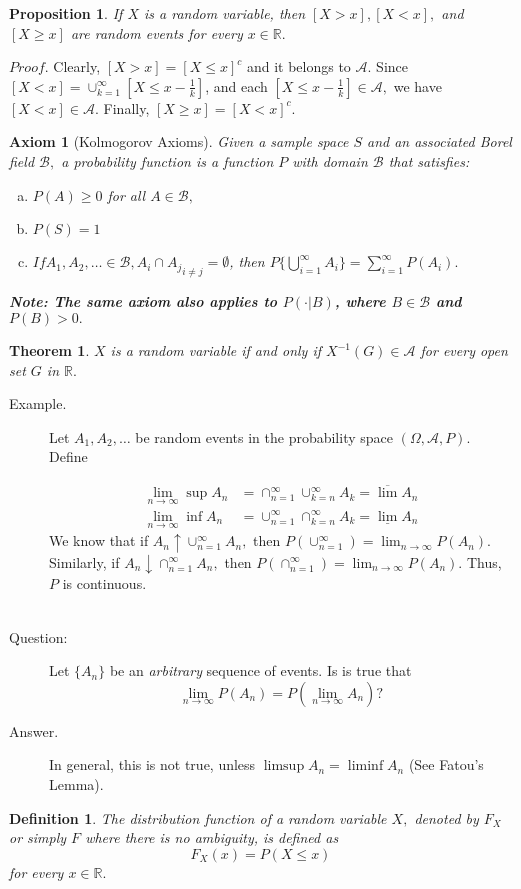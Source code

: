 \documentclass[12pt]{report} \addtolength{\textheight}{2in}
\newtheorem{defn}{Definition}
\newtheorem{axiom}{Axiom}
\newtheorem{prop}{Proposition}
\newtheorem{thm}{Theorem}
\newcommand{\Borel}{\mathscr{B}}
\newcommand{\Realnum}{\mathbb{R}}
\newcommand{\bigA}{\mathcal{A}}
\newcommand{\infU}{ \bigcup_{i=1}^{\infty}}
\newcommand{\probsp}{(\Omega, \bigA, P)}
\newcommand{\infsum}{\sum_{i=1}^{\infty}}
\begin{document}
\begin{prop}
If $X$ is a random variable, then $[X > x],[X < x],$ and $[X \geq x]$ are random events for every $x \in \Realnum.$
\end{prop}
$Proof.$ Clearly, $[X>x]=[X \leq x]^c$ and it belongs to $\bigA.$ Since $[X<x]=\cup_{k=1}^{\infty}[X \leq x -\frac{1}{k}]$, and each $[X \leq x -\frac{1}{k}] \in \bigA,$ we have $[X < x]\in \bigA.$ Finally, $[X \geq x] =[X < x]^c.$
\begin{axiom}[Kolmogorov Axioms]
Given a sample space $S$ and an associated Borel field $\Borel,$ a probability function is a function $P$ with domain $\Borel$ that satisfies:
\begin{enumerate}[a)]
\item $P(A) \geq 0$ for all $A \in \Borel,$
\item $P(S) =1$
\item $ If A_1,A_2,\dots \in \Borel, {A_i \cap A_j}_{i\not = j} = \emptyset$, then $P\{\infU A_i\}=\infsum P(A_i).$
\end{enumerate}
\textbf{Note: The same axiom also applies to $P(\cdot|B)$, where $B\in \Borel$ and $P(B)>0.$}
\end{axiom}
\begin{thm}
$X$ is a random variable if and only if $X^{-1}(G)\in \mathcal{A}$ for every open set $G$ in $\Realnum.$
\end{thm}
\vspace{.1in}
\begin{description}
\item[Example.] Let $A_1,A_2,\dots$ be random events in the probability space $\probsp.$ Define 

\begin{align*}
\lim_{n\to\infty}\sup A_n&=\cap_{n=1}^{\infty}\cup_{k=n}^{\infty} A_k=\overline{\lim} A_n\\
\lim_{n\to\infty}\inf A_n&=\cup_{n=1}^{\infty}\cap_{k=n}^{\infty} A_k=\underline{\lim}A_n
\end{align*}
We know that if $A_n\uparrow \cup_{n=1}^{\infty} A_n,$ then $P(\cup_{n=1}^{\infty})=\lim_{n\to\infty} P(A_n).$ Similarly, if $A_{n}\downarrow \cap_{n=1}^{\infty} A_n,$ then $P(\cap_{n=1}^{\infty})=\lim_{n\to\infty}P(A_n).$ Thus, $P$ is continuous.\\
\\
\item[Question:] Let $\{A_n\}$ be an \textit{arbitrary} sequence of events. Is is true that
\begin{displaymath}
\lim_{n\to\infty} P(A_n)=P(\lim_{n\to\infty}A_n) ?
\end{displaymath}
\item[Answer.] In general, this is not true, unless $\limsup A_n=\liminf A_n$ (See Fatou's Lemma).
\end{description} 
\begin{defn}
The distribution function of a random variable $X,$ denoted by $F_X$ or simply $F$ where there is no ambiguity, is defined as 
\begin{displaymath}
F_X(x)=P(X\leq x)
\end{displaymath}
for every $x\in \Realnum.$
\end{defn}
\end{document}

